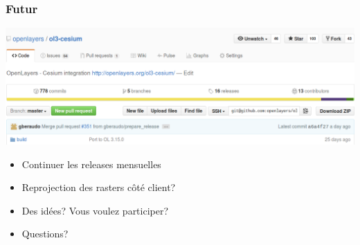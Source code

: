 \documentclass[handout]{beamer}
\begin{document}
  \begin{frame}
    \frametitle{Futur}
    \vspace{-20pt}\begin{center}
      \includegraphics[width=0.9\linewidth]{./github2.png}
    \end{center}
    \begin{itemize}
      \item Continuer les releases mensuelles
        \pause
      \item Reprojection des rasters côté client?
        \pause
      \item Des idées? Vous voulez participer?
        \pause
      \item Questions?
    \end{itemize}
  \end{frame}
\end{document}
